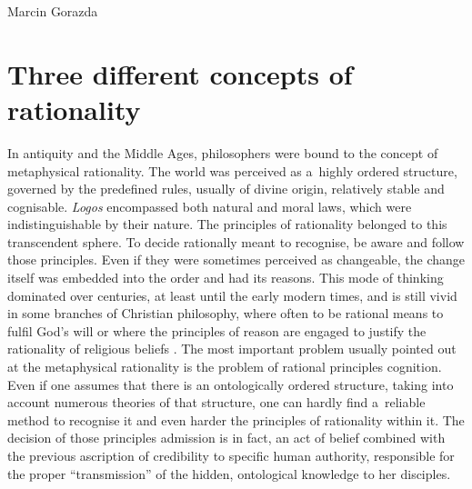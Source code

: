 \begin{artengenv}{Marcin Gorazda}
\section*{Three different concepts of rationality}
In antiquity and the Middle Ages, philosophers were bound to the concept of metaphysical rationality. The world was perceived as a~highly ordered structure, governed by the predefined rules, usually of divine origin, relatively stable and cognisable. \textit{Logos} encompassed both natural and moral laws, which were indistinguishable by their nature. The principles of rationality belonged to this transcendent sphere. To decide rationally meant to recognise, be aware and follow those principles. Even if they were sometimes perceived as changeable, the change itself was embedded into the order and had its reasons. This mode of thinking dominated over centuries, at least until the early modern times, and is still vivid in some branches of Christian philosophy, where often to be rational means to fulfil God's will or where the principles of reason are engaged to justify the rationality of religious beliefs
\parencites[][]{wszolek_wprowadzenie_2004}[][]{jordan_pascals_2006}[][]{gorazda_pragmatyzm_2009}. %
 The most important problem usually pointed out at the metaphysical rationality is the problem of rational principles cognition. Even if one assumes that there is an ontologically ordered structure, taking into account numerous theories of that structure, one can hardly find a~reliable method to recognise it and even harder the principles of rationality within it. The decision of those principles admission is in fact, an act of belief combined with the previous ascription of credibility to specific human authority, responsible for the proper ``transmission'' of the hidden, ontological knowledge to her disciples.


\end{artengenv}

